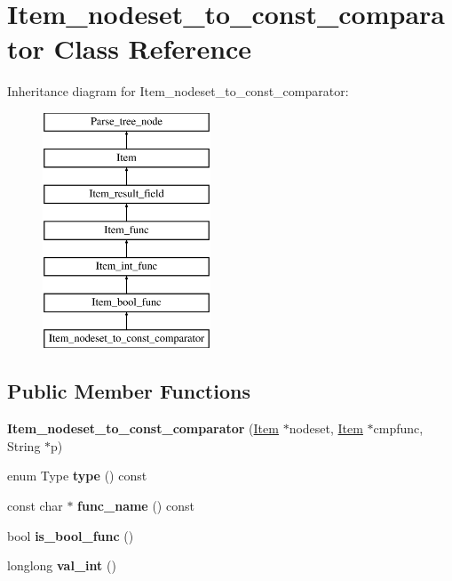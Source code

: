 \hypertarget{classItem__nodeset__to__const__comparator}{}\section{Item\+\_\+nodeset\+\_\+to\+\_\+const\+\_\+comparator Class Reference}
\label{classItem__nodeset__to__const__comparator}
Inheritance diagram for Item\+\_\+nodeset\+\_\+to\+\_\+const\+\_\+comparator\+:\begin{figure}[H]
\begin{center}
\leavevmode
\includegraphics[height=7.000000cm]{classItem__nodeset__to__const__comparator}
\end{center}
\end{figure}
\subsection*{Public Member Functions}
\begin{DoxyCompactItemize}
\item 
\mbox{\label{classItem__nodeset__to__const__comparator_a4b1cabb9b58d8a321096dca823ce87e6}} 
{\bfseries Item\+\_\+nodeset\+\_\+to\+\_\+const\+\_\+comparator} (\mbox{\hyperlink{classItem}{Item}} $\ast$nodeset, \mbox{\hyperlink{classItem}{Item}} $\ast$cmpfunc, String $\ast$p)
\item 
\mbox{\label{classItem__nodeset__to__const__comparator_adc4d44145c7213f62d4e2a50db3e02eb}} 
enum Type {\bfseries type} () const
\item 
\mbox{\label{classItem__nodeset__to__const__comparator_a7c037b963a0f2b941c0291a21dfa0539}} 
const char $\ast$ {\bfseries func\+\_\+name} () const
\item 
\mbox{\label{classItem__nodeset__to__const__comparator_a0a76547d47e8f35a6e3369155b321c99}} 
bool {\bfseries is\+\_\+bool\+\_\+func} ()
\item 
\mbox{\label{classItem__nodeset__to__const__comparator_a3ea1e09e36bb7aef4853e5336b890633}} 
longlong {\bfseries val\+\_\+int} ()
\end{DoxyCompactItemize}
